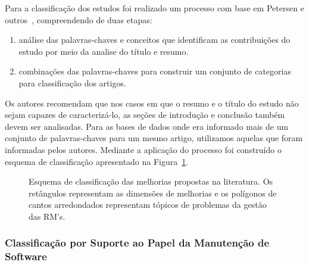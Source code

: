 Para a classificação dos estudos foi realizado um processo com base em Petersen
e outros~\cite{Petersen2008}, compreendendo de duas etapas:

\begin{enumerate}[I]
	\item análise das palavras-chaves e conceitos que
		identificam as contribuições do estudo por meio da analise do título e
		resumo.
	\item combinações das palavras-chaves para construir um conjunto de
		categorias para classificação dos artigos.
\end{enumerate}

Os autores recomendam que nos casos em que o resumo e o título do estudo não
sejam capazes de caracterizá-lo, as seções de introdução e conclusão também
devem ser analisadas. Para as bases de dados onde era informado mais de um
conjunto de palavras-chaves para um mesmo artigo, utilizamos aquelas que foram
informadas pelos autores. Mediante a aplicação do processo foi construído o
esquema de classificação apresentado na
Figura~\ref{fig:diagrama-esquema-dimensao-melhorias}.

\begin{figure}[tb] \centering
	\caption{Esquema de classificação das melhorias propostas na literatura. Os
		retângulos representam as dimensões de melhorias e os polígonos de
		cantos arredondados representam tópicos de problemas da gestão das
		RM's.}
\label{fig:diagrama-esquema-dimensao-melhorias}
\end{figure}

\subsubsection{Classificação por Suporte ao Papel da Manutenção de Software}
\label{subsubsec:map-esquema-suporte-papel-man}

